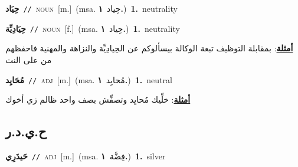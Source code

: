 \documentclass[10pt,a4paper,twoside]{article} %
\begin{document}
\begin{multicols}{2}
{\setlength\topsep{0pt}\textbf{\foreignlanguage{arabic}{حِيَاد}}\ {\color{gray}\texttt{//}\color{black}}\ \textsc{noun}\ [m.]\ \color{gray}(msa. \foreignlanguage{arabic}{حِياد}~\foreignlanguage{arabic}{\textbf{١.}})\color{black}\ \textbf{1.}~neutrality\ } \vspace{2mm}

{\setlength\topsep{0pt}\textbf{\foreignlanguage{arabic}{حِيَادِيِّة}}\ {\color{gray}\texttt{//}\color{black}}\ \textsc{noun}\ [f.]\ \color{gray}(msa. \foreignlanguage{arabic}{حِياد}~\foreignlanguage{arabic}{\textbf{١.}})\color{black}\ \textbf{1.}~neutrality\  \begin{flushright}\color{gray}\foreignlanguage{arabic}{\textbf{\underline{\foreignlanguage{arabic}{أمثلة}}}: بمقابلة التوظيف تبعة الوكالة بيسألوكم عن الحِيادِيِّة والنزاهة والمهنية فاحفظهم من على النت}\end{flushright}\color{black}} \vspace{2mm}

{\setlength\topsep{0pt}\textbf{\foreignlanguage{arabic}{مُحَايِد}}\ {\color{gray}\texttt{//}\color{black}}\ \textsc{adj}\ [m.]\ \color{gray}(msa. \foreignlanguage{arabic}{مُحايِد}~\foreignlanguage{arabic}{\textbf{١.}})\color{black}\ \textbf{1.}~neutral\  \begin{flushright}\color{gray}\foreignlanguage{arabic}{\textbf{\underline{\foreignlanguage{arabic}{أمثلة}}}: خلِّيك مُحايِد وتصفِّش بصف واحد ظالم زي أخوك}\end{flushright}\color{black}} \vspace{2mm}

\vspace{-3mm}
\subsection*{\color{blue}\foreignlanguage{arabic}{ح.ي.د.ر}\color{blue}{}} 

{\setlength\topsep{0pt}\textbf{\foreignlanguage{arabic}{حَيدَرِي}}\ {\color{gray}\texttt{//}\color{black}}\ \textsc{adj}\ [m.]\ \color{gray}(msa. \foreignlanguage{arabic}{فِضَّة}~\foreignlanguage{arabic}{\textbf{١.}})\color{black}\ \textbf{1.}~silver\ } \vspace{2mm}


\end{multicols}
\end{document}
